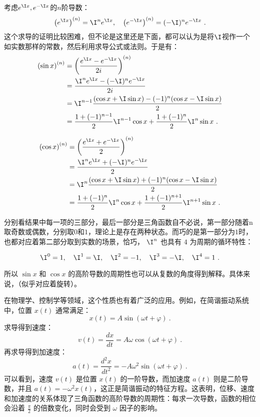 考虑$e^{\I x},e^{-\I x}$的$n$阶导数：
\begin{equation}
\left(e^{\I x}\right)^{(n)} = \I^n e^{\I x},\quad\left(e^{-\I x}\right)^{(n)} = (-\I)^n e^{-\I x}~.
\end{equation}
这个求导的证明比较困难，但不论是这里还是下面，都可以认为是将$\I$视作一个如实数那样的常数，然后利用求导公式或法则。于是有：
\begin{equation}
\begin{split}
\left( \sin x \right)^{(n)} &= \left( \frac{e^{\I x} - e^{-\I x}}{2i} \right)^{(n)}\\
&=\frac{\I^n e^{\I x} - (-\I)^n e^{-\I x}}{2i}\\
&=\I^{n-1} \frac{(\cos x+\I\sin x) - (-1)^{n}(\cos x-\I\sin x )}{2}\\
&=\frac{1+(-1)^{n-1}}{2}\I^{n-1} \cos x+\frac{1+(-1)^{n}}{2}\I^{n} \sin x~.
\end{split}
\end{equation}

\begin{equation}
\begin{split}
\left( \cos x \right)^{(n)} &= \left( \frac{e^{\I x} + e^{-\I x}}{2} \right)^{(n)}\\
&=\frac{\I^n e^{\I x} + (-\I)^n e^{-\I x}}{2}\\
&=\I^{n} \frac{(\cos x+\I\sin x) + (-1)^{n}(\cos x-\I\sin x )}{2}\\
&=\frac{1+(-1)^{n}}{2}\I^{n} \cos x+\frac{1+(-1)^{n+1}}{2}\I^{n+1} \sin x~.
\end{split}
\end{equation}

分别看结果中每一项的三部分，最后一部分是三角函数自不必说，第一部分随着n取奇数或偶数，分别取$0$和$1$，理论上是存在两种状态。而巧的是第一部分为$1$时，也都对应着第二部分取到实数的场景，恰巧， $\I^n$ 也具有 $4$ 为周期的循环特性：

\begin{equation}
\I^0 = 1, \quad \I^1 = \I, \quad \I^2 = -1, \quad \I^3 = -\I, \quad \I^4 = 1~.
\end{equation}

所以 $\sin x$ 和 $\cos x$ 的高阶导数的周期性也可以从复数的角度得到解释。具体来说，（似乎对应着旋转）。


在物理学、控制学等领域，这个性质也有着广泛的应用。例如，在简谐振动系统中，位置 $x(t)$ 通常满足：
\begin{equation}
x(t) = A \sin(\omega t + \varphi)~.
\end{equation}
求导得到速度：
\begin{equation}
v(t) = \frac{dx}{dt} = A\omega \cos(\omega t + \varphi)~.
\end{equation}
再求导得到加速度：
\begin{equation}
a(t) = \frac{d^2x}{dt^2} = -A\omega^2 \sin(\omega t + \varphi)~.
\end{equation}
可以看到，速度 $v(t)$ 是位置 $x(t)$ 的一阶导数，而加速度 $a(t)$ 则是二阶导数，并且 $a(t) = -\omega^2 x(t)$，这正是简谐振动的特征方程。这表明，位移、速度和加速度的关系体现了三角函数的高阶导数的周期性：每求一次导数，函数的相位会沿着 $\frac{\pi}{2}$ 的倍数变化，同时会受到 $\omega$ 因子的影响。

